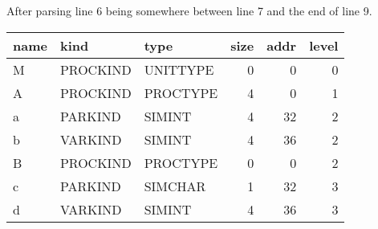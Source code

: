 After parsing line 6 being somewhere between line 7 and the end of line 9.

\begin{tabular}{lllrrr}
name & kind & type & size & addr & level \\
\hline
M & PROCKIND & UNITTYPE & 0 & 0 & 0 \\
A & PROCKIND & PROCTYPE & 4 & 0 & 1 \\
a & PARKIND & SIMINT & 4 & 32 & 2 \\
b & VARKIND & SIMINT & 4 & 36 & 2 \\
B & PROCKIND & PROCTYPE & 0 & 0 & 2 \\
c & PARKIND & SIMCHAR & 1 & 32 & 3 \\
d & VARKIND & SIMINT & 4 & 36 & 3
\end{tabular}

